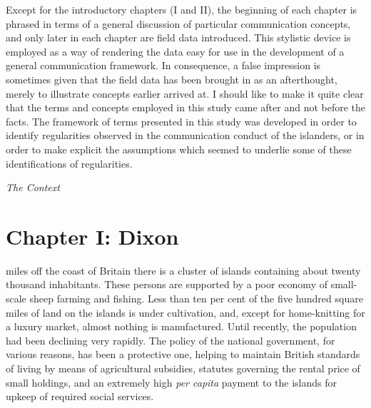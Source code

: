 \documentclass[twoside,symmetric,nobib,justified]{tufte-book}
\let\oldchapter\chapter
\def\chapter{%
  \setcounter{footnote}{0}%
  \oldchapter
}
\begin{document}
Except for the introductory chapters (I and II), the beginning of each
chapter is phrased in terms of a general discussion of particular
communication concepts, and only later in each chapter are field data
introduced. This stylistic device is employed as a way of rendering the
data easy for use in the development of a general communication
framework. In consequence, a false impression is sometimes given that
the field data has been brought in as an afterthought, merely to
illustrate concepts earlier arrived at. I should like to make it quite
clear that the terms and concepts employed in this study came after and
not before the facts. The framework of terms presented in this study was
developed in order to identify regularities observed in the
communication conduct of the islanders, or in order to make explicit the
assumptions which seemed to underlie some of these identifications of
regularities.

\newpage
\thispagestyle{plain} %
\mbox{}


\newpage
\thispagestyle{empty}
\begin{fullwidth}

\begin{center}
\vspace*{3in}

{\fontsize{35}{24}\selectfont{Part One}\par}

\vspace{1in}

{\fontsize{35}{24}\selectfont\textit{The Context}\par}

\end{center}

\end{fullwidth}


\chapter[CHAPTER I: DIXON]{Chapter I: Dixon}
\label{ch:Chapter I: Dixon}

 miles off the coast of Britain there is a cluster of
islands containing about twenty thousand inhabitants. These persons are
supported by a poor economy of small-scale sheep farming and fishing.
Less than ten per cent of the five hundred square miles of land on the
islands is under cultivation, and, except for home-knitting for a luxury
market, almost nothing is manufactured. Until recently, the population
had been declining very rapidly. The policy of the national government,
for various reasons, has been a protective one, helping to maintain
British standards of living by means of agricultural subsidies, statutes
governing the rental price of small holdings, and an extremely high
\emph{per capita} payment to the islands for upkeep of required social
services.
\end{document}
